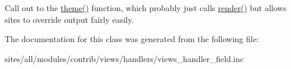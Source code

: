 Call out to the \hyperlink{classviews__handler__field_31b777437d94e4904c546e3bb0d76c16}{theme()} function, which probably just calls \hyperlink{classviews__handler__field_82ff951c5e9ceb97b2eab86f880cbc1e}{render()} but allows sites to override output fairly easily. 

The documentation for this class was generated from the following file:\begin{CompactItemize}
\item 
sites/all/modules/contrib/views/handlers/views\_\-handler\_\-field.inc\end{CompactItemize}
